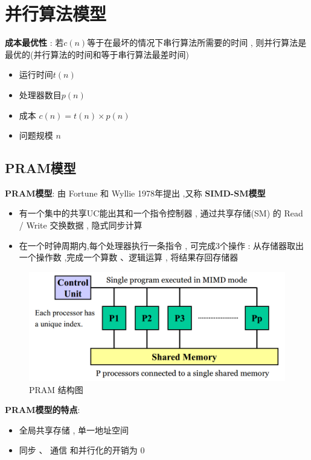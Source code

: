 \documentclass[UTF8,a4paper]{ctexart}
\begin{document}
  \section{并行算法模型}
  \textbf{成本最优性} : 若$c(n)$等于在最坏的情况下串行算法所需要的时间 , 则并行算法是最优的(并行算法的时间和等于串行算法最差时间)
    \begin{itemize}
      \item 运行时间$t(n)$
      \item 处理器数目$p(n)$
      \item 成本 $c(n) = t(n) \times p(n)$
      \item 问题规模 $n$
    \end{itemize}

  \subsection{PRAM模型}
  \textbf{PRAM模型}: 由 Fortune 和 Wyllie 1978年提出 ,又称 \textbf{SIMD-SM模型}

  \begin{itemize}
    \item 有一个集中的共享UC能出其和一个指令控制器 , 通过共享存储(SM) 的 Read / Write 交换数据 , 隐式同步计算
    \item 在一个时钟周期内,每个处理器执行一条指令 , 可完成3个操作 : 从存储器取出一个操作数 ,完成一个算数 、逻辑运算 , 将结果存回存储器
  \end{itemize}
  \begin{figure}[H]
    \centering
    \includegraphics[scale = 0.3]{assets/ParallelComputing_4dc7b.png}
    \caption{PRAM 结构图}
  \end{figure}

  \textbf{PRAM模型的特点}:
  \begin{itemize}
    \item 全局共享存储 , 单一地址空间
    \item 同步 、 通信 和并行化的开销为 0
  \end{itemize}
\end{document}
